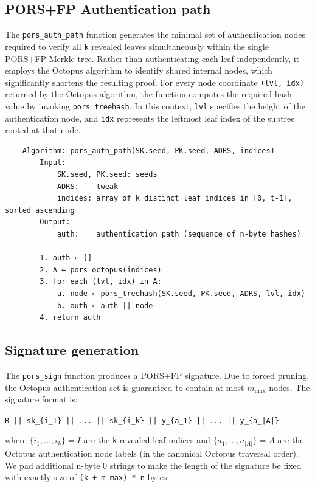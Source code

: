 \subsection{PORS+FP Authentication path}

The \texttt{pors\_auth\_path} function generates the minimal set of authentication nodes required to verify all \texttt{k} revealed leaves simultaneously within the single PORS+FP Merkle tree. 
Rather than authenticating each leaf independently, it employs the Octopus algorithm to identify shared internal nodes, which significantly shortens the resulting proof. 
For every node coordinate \texttt{(lvl, idx)} returned by the Octopus algorithm, the function computes the required hash value by invoking \texttt{pors\_treehash}. 
In this context, \texttt{lvl} specifies the height of the authentication node, and \texttt{idx} represents the leftmost leaf index of the subtree rooted at that node.
\begin{verbatim}
    Algorithm: pors_auth_path(SK.seed, PK.seed, ADRS, indices)
        Input:
            SK.seed, PK.seed: seeds
            ADRS:    tweak
            indices: array of k distinct leaf indices in [0, t-1], sorted ascending
        Output:
            auth:    authentication path (sequence of n-byte hashes)

        1. auth ← []
        2. A ← pors_octopus(indices)
        3. for each (lvl, idx) in A:  
            a. node ← pors_treehash(SK.seed, PK.seed, ADRS, lvl, idx)
            b. auth ← auth || node
        4. return auth
\end{verbatim}

\subsection{Signature generation}
The \texttt{pors\_sign} function produces a PORS+FP signature. Due to forced pruning, the Octopus authentication set is guaranteed to contain at most $m_{\max}$ nodes. The signature format is:
\begin{center}
    \texttt{R || sk\_\{i\_1\} || ... || sk\_\{i\_k\} || y\_\{a\_1\} || ... || y\_\{a\_{|A|}\}}
\end{center}
where $\{i_1,\dots,i_k\} = I$ are the \texttt{k} revealed leaf indices and $\{a_1,\dots,a_{|A|}\} = A$ are the Octopus authentication node labels (in the canonical Octopus traversal order).
We pad additional n-byte 0 strings to make the length of the signature be fixed with exactly size of \texttt{(k + m\_max) * n} bytes.

